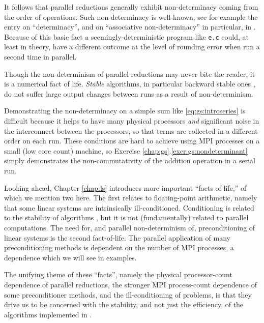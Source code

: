 It follows that parallel reductions generally exhibit non-determinacy coming from the order of operations.  Such non-determinacy is well-known; see for example the entry on ``determinacy'', and on ``associative non-determinacy'' in particular, in \citep{Padua2011}.  Because of this basic fact a seemingly-deterministic program like \texttt{e.c} could, at least in theory, have a different outcome at the level of rounding error when run a second time in parallel.

Though the non-determinism of parallel reductions may never bite the reader, it is a numerical fact of life.  \emph{Stable} algorithms, in particular backward stable ones \citep{TrefethenBau1997}, do not suffer large output changes between runs as a result of non-determinism.

Demonstrating the non-determinacy on a simple sum like \eqref{eq:gs:introseries} is difficult because it helps to have many physical processors \emph{and} significant noise in the interconnect between the processors, so that terms are collected in a different order on each run.  These conditions are hard to achieve using MPI processes on a small (low core count) machine, so Exercise \ref{chap:gs}.\ref{exer:gs:nondeterminant} simply demonstrates the non-commutativity of the addition operation in a serial run.

Looking ahead, Chapter \ref{chap:ls} introduces more important ``facts of life,'' of which we mention two here.  The first relates to floating-point arithmetic, namely that some linear systems are intrinsically ill-conditioned.  Conditioning is related to the stability of algorithms \citep{TrefethenBau1997}, but it is not (fundamentally) related to parallel computations.  The need for, and parallel non-determinism of, preconditioning of linear systems is the second fact-of-life.  The parallel application of many preconditioning methods is dependent on the number of MPI processes, a dependence which we will see in examples.

The unifying theme of these ``facts'', namely the physical processor-count dependence of parallel reductions, the stronger MPI process-count dependence of some preconditioner methods, and the ill-conditioning of problems, is that they drive us to be concerned with the stability, and not just the efficiency, of the algorithms implemented in \PETSc.


